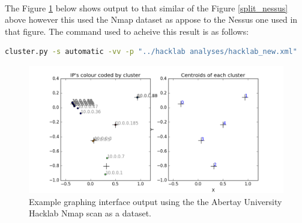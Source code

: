 \paragraph{}The Figure \ref{split_nmap} below shows output to that similar of the Figure \ref{split_nessus} above however this used the Nmap dataset as appose to the Nessus one used in that figure. The command used to acheive this result is as follows:
\begin{lstlisting}[language=bash]
cluster.py -s automatic -vv -p "../hacklab analyses/hacklab_new.xml"
\end{lstlisting}
\begin{figure}[!h]
\centering
\includegraphics[width=5.5in]{./Figures/split_nmap.png}
\caption{Example graphing interface output using the the Abertay University Hacklab Nmap scan as a dataset.}
\label{split_nmap}
\end{figure}

